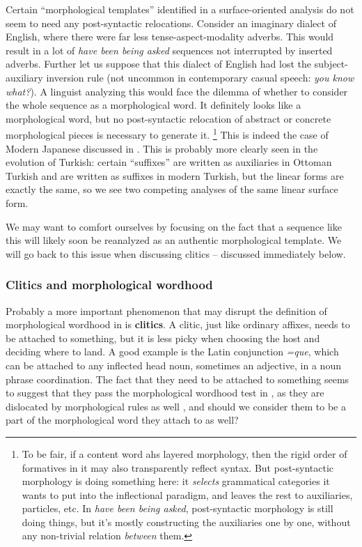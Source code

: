 \documentclass[a4paper, oneside, scheme=plain, 12pt]{article}
\newcommand*{\concept}[1]{\textbf{#1}}
\newcommand{\form}[1]{\emph{#1}}
\begin{document}
Certain ``morphological templates'' identified in a surface-oriented analysis
do not seem to need any post-syntactic relocations.
Consider an imaginary dialect of English,
where there were far less tense-aspect-modality adverbs.
This would result in a lot of \form{have been being asked} sequences
not interrupted by inserted adverbs.
Further let us suppose that this dialect of English had lost the subject-auxiliary inversion rule
(not uncommon in contemporary casual speech: \form{you know what?}).
A linguist analyzing this would face the dilemma of whether to
consider the whole sequence as a morphological word.
It definitely looks like a morphological word,
but no post-syntactic relocation of abstract or concrete morphological pieces is necessary to generate it.%
\footnote{
    To be fair, if a content word ahs layered morphology,
    then the rigid order of formatives in it may also transparently reflect syntax.
    But post-syntactic morphology is doing something here:
    it \emph{selects} grammatical categories it wants to put into the inflectional paradigm,
    and leaves the rest to auxiliaries, particles, etc.
    In \form{have been being asked}, post-syntactic morphology is still doing things,
    but it's mostly constructing the auxiliaries one by one,
    without any non-trivial relation \emph{between} them.
}
This is indeed the case of Modern Japanese discussed in .
This is probably more clearly seen in the evolution of Turkish:
certain ``suffixes'' are written as auxiliaries in Ottoman Turkish
and are written as suffixes in modern Turkish,
but the linear forms are exactly the same,
so we see two competing analyses of the same linear surface form.

We may want to comfort ourselves by focusing on the fact that a sequence like this will likely soon be reanalyzed as an authentic morphological template.
We will go back to this issue when discussing clitics -- discussed immediately below.

\subsubsection{Clitics and morphological wordhood}\label{sec:morphological-wordhood-clitics}

Probably a more important phenomenon that may disrupt the definition of morphological wordhood in  is \concept{clitics}.
A clitic, just like ordinary affixes, needs to be attached to something,
but it is less picky when choosing the host and deciding where to land.
A good example is the Latin conjunction \form{=que},
which can be attached to any inflected head noun,
sometimes an adjective, in a noun phrase coordination.
The fact that they need to be attached to something
seems to suggest that they pass the morphological wordhood test in ,
as they are dislocated by morphological rules as well \citep{harley1999distributed},
and should we consider them to be a part of the morphological word they attach to as well?
\end{document}
